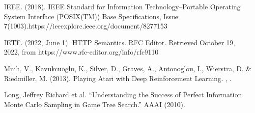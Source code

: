 \documentclass[11pt, oneside]{book}
\begin{document}
\begin{thebibliography}{111}
      IEEE. (2018). IEEE Standard for Information
      Technology--Portable Operating System Interface (POSIX(TM)) Base
      Specifications, Issue 7(1003).https://ieeexplore.ieee.org/document/8277153

      IETF. (2022, June 1). HTTP Semantics. RFC Editor.
      Retrieved October 19, 2022, from https://www.rfc-editor.org/info/rfc9110


      Mnih, V., Kavukcuoglu, K., Silver, D., Graves, A.,
      Antonoglou, I., Wierstra, D. \& Riedmiller, M. (2013). Playing Atari with
      Deep Reinforcement Learning. , .

      Long, Jeffrey Richard et al. “Understanding the Success
      of Perfect Information Monte Carlo Sampling in Game Tree Search.” AAAI
      (2010).





























\end{thebibliography}
\end{document}
